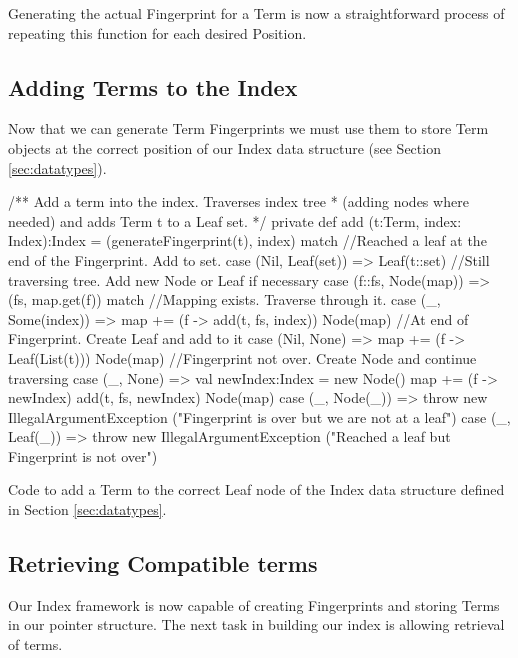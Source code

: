Generating the actual Fingerprint for a Term is now a straightforward process
of repeating this function for each desired Position.

\subsection{Adding Terms to the Index}
Now that we can generate Term Fingerprints we must use them to store Term objects
at the correct position of our Index data structure (see Section \ref{sec:datatypes}).

\begin{listing}[H]
\begin{scalacode}
/** Add a term into the index. Traverses index tree
  * (adding nodes where needed) and adds Term t to a Leaf set. */
private def add (t:Term, index: Index):Index =
(generateFingerprint(t), index)  match {
  //Reached a leaf at the end of the Fingerprint. Add to set.
  case (Nil,   Leaf(set)) => Leaf(t::set)
  //Still traversing tree. Add new Node or Leaf if necessary
  case (f::fs, Node(map)) => (fs, map.get(f)) match {
    //Mapping exists. Traverse through it.
    case (_,   Some(index)) => {map += (f -> add(t, fs, index))
                                Node(map)}
    //At end of Fingerprint. Create Leaf and add to it
    case (Nil, None) => {map += (f -> Leaf(List(t)))
                         Node(map)}
    //Fingerprint not over. Create Node and continue traversing
    case (_,   None) => {val newIndex:Index = new Node()
                         map += (f -> newIndex)
                         add(t, fs, newIndex)
                         Node(map)}
  }
  case (_, Node(_)) => throw new IllegalArgumentException
                ("Fingerprint is over but we are not at a leaf")
  case (_, Leaf(_)) => throw new IllegalArgumentException
                ("Reached a leaf but Fingerprint is not over")
}
\end{scalacode}
\caption{Code to add a Term to the correct Leaf node of the Index data
structure defined in Section \ref{sec:datatypes}.}
\label{lst:addterm}
\end{listing} 

\subsection{Retrieving Compatible terms}

Our Index framework is now capable of creating Fingerprints and storing Terms in
our pointer structure. The next task in building our index is allowing retrieval
of terms.

